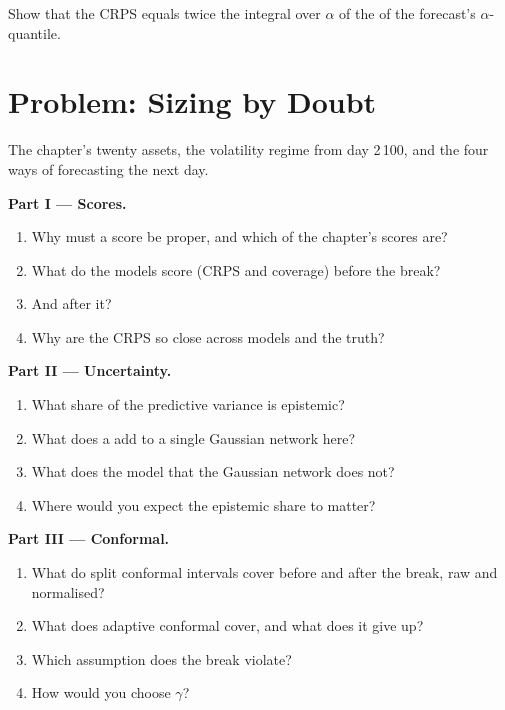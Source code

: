 \begin{exercise}[$\star\star\star$]\label{exo:ml:probabilistic-models-and-uncertainty:8}
Show that the CRPS equals twice the integral over $\alpha$ of the  of the forecast's $\alpha$-quantile.
\end{exercise}

\section{Problem: Sizing by Doubt}

\begin{problem}\label{pb:ml:probabilistic-models-and-uncertainty:1}
The chapter's twenty assets, the volatility regime from day 2\,100, and the four ways of forecasting the next day.

\medskip\noindent\textbf{Part I --- Scores.}
\begin{enumerate}
\item Why must a score be proper, and which of the chapter's scores are?
\item What do the models score (CRPS and coverage) before the break?
\item And after it?
\item Why are the CRPS so close across models and the truth?
\end{enumerate}

\medskip\noindent\textbf{Part II --- Uncertainty.}
\begin{enumerate}[resume]
\item What share of the predictive variance is epistemic?
\item What does a  add to a single Gaussian network here?
\item What does the  model that the Gaussian network does not?
\item Where would you expect the epistemic share to matter?
\end{enumerate}

\medskip\noindent\textbf{Part III --- Conformal.}
\begin{enumerate}[resume]
\item What do split conformal intervals cover before and after the break, raw and normalised?
\item What does adaptive conformal cover, and what does it give up?
\item Which assumption does the break violate?
\item How would you choose $\gamma$?
\end{enumerate}


\end{problem}
